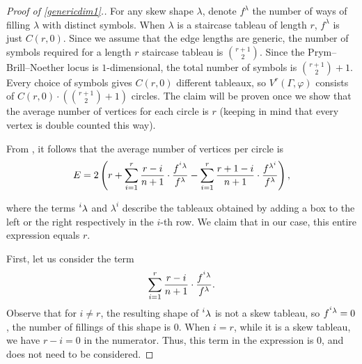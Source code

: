 \documentclass[11pt,reqno]{amsart}
\newcommand{\yoav}[1]{{\color{blue} \sf  Yo$\alpha$v: [#1]}}
\newcommand{\derek}[1]{{\color{Green} \sf D: [#1]}}
\theoremstyle{definition}
\theoremstyle{problem}
\theoremstyle{plain}
\theoremstyle{remark}
\theoremstyle{theorem}
\numberwithin{equation}{section}
\numberwithin{figure}{section}
\begin{document}
\begin{proof}[Proof of \cref{genericdim1}.]
	For any skew shape $\lambda$, denote $f^\lambda$ the number of ways of filling $\lambda$ with distinct symbols. When $\lambda$ is a staircase tableau of length $r$, $f^\lambda$ is just $C(r,0)$. Since we assume that the edge lengths are generic, the number of symbols required for a length $r$ staircase tableau is $\binom{r+1}{2}$. Since the Prym--Brill--Noether locus is $1$-dimensional, the total number of symbols is $\binom{r+1}{2}+1$. Every choice of symbols gives $C(r,0)$ different tableaux, so $V^r(\Gamma,\varphi)$ consists of $C(r,0) \cdot \left(\binom{r+1}{2}+1\right)$ circles. The claim will be proven once we show that the average number of vertices for each circle is $r$ (keeping in mind that every vertex is double counted this way).
	
	
	
	From \cite[Theorem~2.9]{chan2018genera}, it follows that the average number of vertices per circle is
	\begin{gather*}
		E= 2\left(r+\sum_{i=1}^{r}\frac{r-i}{n+1} \cdot
		\frac{f^{\prescript{i}{}{\lambda}}}{f^{\lambda}}-\sum_{i=1}^{r}\frac{r+1-i}{n+1} \cdot
		\frac{f^{\lambda^{i}}}{f^{\lambda}}\right),
	\end{gather*}
	
	where the terms $\prescript{i}{}{\lambda}$ and $\lambda^{i}$ describe the tableaux  obtained by adding a box to the left or the right respectively in the $i$-th row. We claim that in our case, this entire expression equals $r$.  
	
	First, let us consider the term 
	\begin{gather*}
		\sum_{i=1}^{r}\frac{r-i}{n+1} \cdot
		\frac{f^{\prescript{i}{}{\lambda}}}{f^{\lambda}}.
	\end{gather*}
	Observe that for $i\neq r$, the resulting shape of $\prescript{i}{}{\lambda}$ is not a skew tableau, so $f^{\prescript{i}{}{\lambda}}=0$, the number of fillings of this shape is $0$.  When $i=r$, while it is a skew tableau, we have $r-i=0$ in
	the numerator. Thus, this term in the expression is 0, and
	does not need to be considered.
	

\end{proof}
\end{document}
